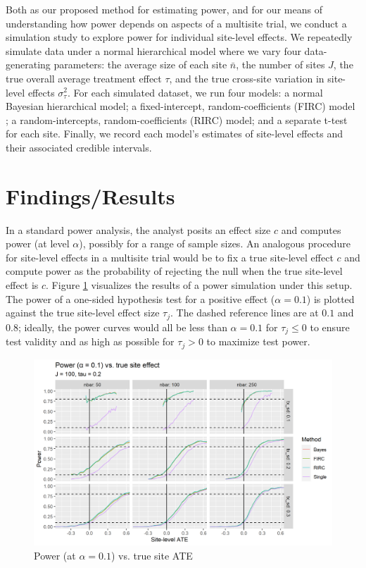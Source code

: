 \documentclass[]{article}
\begin{document}
Both as our proposed method for estimating power, and for our means of understanding how power depends on aspects of a multisite trial, we conduct a simulation study to explore power for individual site-level effects. 
We repeatedly simulate data under a normal hierarchical model where we vary four data-generating parameters: the average size of each site $\bar{n}$, the number of sites $J$, the true overall average treatment effect $\tau$, and the true cross-site variation in site-level effects $\sigma^2_\tau$.
For each simulated dataset, we run four models: a normal Bayesian hierarchical model; a fixed-intercept, random-coefficients (FIRC) model \citep{bloom2017using}; a random-intercepts, random-coefficients (RIRC) model; and a separate t-test for each site. Finally, we record each model’s estimates of site-level effects and their associated credible intervals.

\section{Findings/Results}

In a standard power analysis, the analyst posits an effect size $c$ and computes power (at level $\alpha$), possibly for a range of sample sizes.
An analogous procedure for site-level effects in a multisite trial would be to fix a true site-level effect $c$ and compute power as the probability of rejecting the null when the true site-level effect is $c$.
Figure \ref{fig:power_plot} visualizes the results of a power simulation under this setup.
The power of a one-sided hypothesis test for a positive effect ($\alpha = 0.1$) is plotted against the true site-level effect size $\tau_j$.
The dashed reference lines are at $0.1$ and $0.8$; 
ideally, the power curves would all be less than $\alpha = 0.1$ for $\tau_j \leq 0$ to ensure test validity and as high as possible for $\tau_j > 0$ to maximize test power.
\begin{figure}[ht]
	\centering
	\includegraphics[width=\textwidth]{power_plot_J100}
	\caption{Power (at $\alpha = 0.1$) vs. true site ATE}
	\label{fig:power_plot}
\end{figure}
\end{document}
